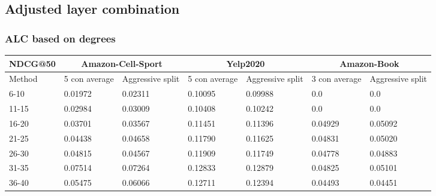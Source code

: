 \subsection{Adjusted layer combination}\label{app:adjusted-layer-combi}


\subsubsection{ALC based on degrees}
\begin{table*}[h!]
    \centering
    \begin{tabular}{|l|l|l||l|l||l|l|}
        \hline
        NDCG@50   & \multicolumn{2}{c||}{Amazon-Cell-Sport} & \multicolumn{2}{c||}{Yelp2020} & \multicolumn{2}{c|}{Amazon-Book}                                                       \\ \hline
        Method    & 5 con average                           & Aggressive split               & 5 con average                    & Aggressive split & 3 con average & Aggressive split \\ \hline
        6-10      & 0.01972                                 & 0.02311                        & 0.10095                          & 0.09988          & 0.0           & 0.0              \\ \hline
        11-15     & 0.02984                                 & 0.03009                        & 0.10408                          & 0.10242          & 0.0           & 0.0              \\ \hline
        16-20     & 0.03701                                 & 0.03567                        & 0.11451                          & 0.11396          & 0.04929       & 0.05092          \\ \hline
        21-25     & 0.04438                                 & 0.04658                        & 0.11790                          & 0.11625          & 0.04831       & 0.05020          \\ \hline
        26-30     & 0.04815                                 & 0.04567                        & 0.11909                          & 0.11749          & 0.04778       & 0.04883          \\ \hline
        31-35     & 0.07514                                 & 0.07264                        & 0.12833                          & 0.12879          & 0.04825       & 0.05101          \\ \hline
        36-40     & 0.05475                                 & 0.06066                        & 0.12711                          & 0.12394          & 0.04493       & 0.04451          \\ \hline

\end{tabular}
\end{table*}

